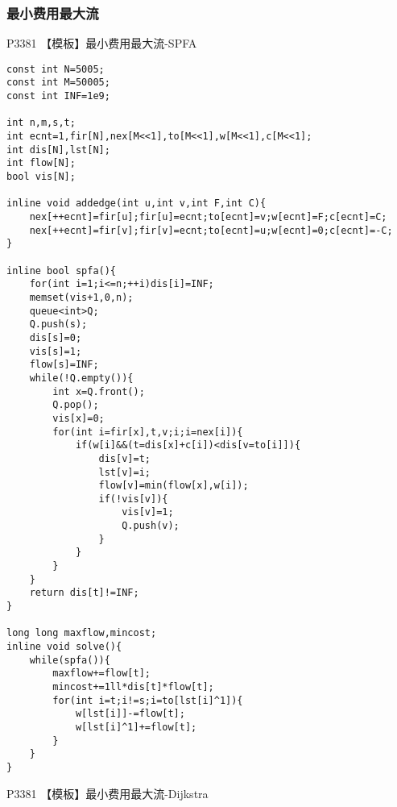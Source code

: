 \documentclass{ctexart}
\begin{document}
\subsubsection{最小费用最大流}
P3381 【模板】最小费用最大流-SPFA
\begin{lstlisting}
const int N=5005;
const int M=50005;
const int INF=1e9;

int n,m,s,t;
int ecnt=1,fir[N],nex[M<<1],to[M<<1],w[M<<1],c[M<<1];
int dis[N],lst[N];
int flow[N];
bool vis[N];

inline void addedge(int u,int v,int F,int C){
    nex[++ecnt]=fir[u];fir[u]=ecnt;to[ecnt]=v;w[ecnt]=F;c[ecnt]=C;
    nex[++ecnt]=fir[v];fir[v]=ecnt;to[ecnt]=u;w[ecnt]=0;c[ecnt]=-C;
}

inline bool spfa(){
    for(int i=1;i<=n;++i)dis[i]=INF;
    memset(vis+1,0,n);
    queue<int>Q;
    Q.push(s);
    dis[s]=0;
    vis[s]=1;
    flow[s]=INF;
    while(!Q.empty()){
        int x=Q.front();
        Q.pop();
        vis[x]=0;
        for(int i=fir[x],t,v;i;i=nex[i]){
            if(w[i]&&(t=dis[x]+c[i])<dis[v=to[i]]){
                dis[v]=t;
                lst[v]=i;
                flow[v]=min(flow[x],w[i]);
                if(!vis[v]){
                    vis[v]=1;
                 	Q.push(v);
                }
            }
        }
    }
    return dis[t]!=INF;
}

long long maxflow,mincost;
inline void solve(){
    while(spfa()){
        maxflow+=flow[t];
        mincost+=1ll*dis[t]*flow[t];
        for(int i=t;i!=s;i=to[lst[i]^1]){
            w[lst[i]]-=flow[t];
            w[lst[i]^1]+=flow[t];
        }
    }
}
\end{lstlisting}
P3381 【模板】最小费用最大流-Dijkstra
\end{document}
